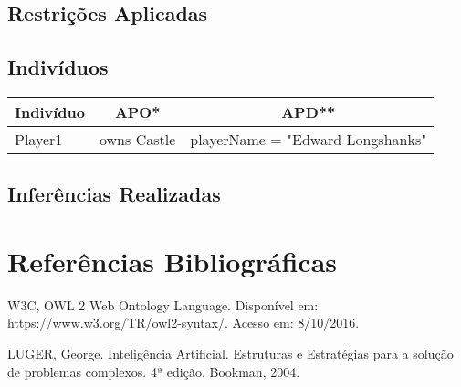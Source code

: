 \documentclass[10pt,a4paper]{article}
\begin{document}
\subsection{Restrições Aplicadas}

\subsection{Indivíduos}

\begin{tabular}{ l c c }
    Indivíduo & APO* & APD** \\
    \hline
    Player1 & owns Castle & playerName = "Edward Longshanks" \\
    \hline
\end{tabular}


\subsection{Inferências Realizadas}


\section{Referências Bibliográficas}

W3C, OWL 2 Web Ontology Language. Disponível em: \url{https://www.w3.org/TR/owl2-syntax/}. Acesso em: 8/10/2016.

LUGER, George. Inteligência Artificial. Estruturas e Estratégias para a solução de problemas complexos. 4ª edição. Bookman, 2004.
\end{document}
